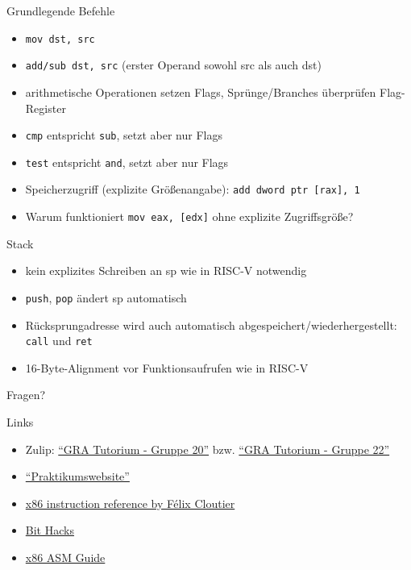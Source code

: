 \begin{frame}[c, fragile]{Grundlegende Befehle}{}
	\begin{itemize}
		\item \verb|mov dst, src|
		\item \verb|add/sub dst, src| (erster Operand sowohl src als auch dst)
		\item arithmetische Operationen setzen Flags, Sprünge/Branches überprüfen Flag-Register
		\item \verb|cmp| entspricht \verb|sub|, setzt aber nur Flags
		\item \verb|test| entspricht \verb|and|, setzt aber nur Flags
		\item Speicherzugriff (explizite Größenangabe): \verb|add dword ptr [rax], 1|
		\item Warum funktioniert \verb|mov eax, [edx]| ohne explizite Zugriffsgröße?
	\end{itemize}
\end{frame}

\begin{frame}[c, fragile]{Stack}{}
	\begin{itemize}
		\item kein explizites Schreiben an sp wie in RISC-V notwendig
		\item \verb|push|, \verb|pop| ändert sp automatisch
		\item Rücksprungadresse wird auch automatisch abgespeichert/wiederhergestellt: \verb|call| und \verb|ret|
		\item 16-Byte-Alignment vor Funktionsaufrufen wie in RISC-V
	\end{itemize}
\end{frame}

\begin{frame}[c]{}{}
	\begin{center}
		\LARGE Fragen?
	\end{center}
\end{frame}

\begin{frame}[fragile, c]{Links}{}
	\begin{itemize}
		\item Zulip: \href{https://zulip.in.tum.de/#narrow/stream/2267-GRA-Tutorium---Gruppe-20}{\enquote{GRA Tutorium - Gruppe 20}}
		      bzw. \href{https://zulip.in.tum.de/#narrow/stream/2269-GRA-Tutorium---Gruppe-22}{\enquote{GRA Tutorium - Gruppe 22}}
		\item \href{https://gra.caps.in.tum.de}{\enquote{Praktikumswebsite}}
		\item \href{https://www.felixcloutier.com/x86/}{x86 instruction reference by Félix Cloutier}
		\item \href{https://graphics.stanford.edu/~seander/bithacks.html#CountBitsSetParallel}{Bit Hacks}
		\item \href{https://flint.cs.yale.edu/cs421/papers/x86-asm/asm.html}{x86 ASM Guide}
	\end{itemize}
\end{frame}

\maketitle


